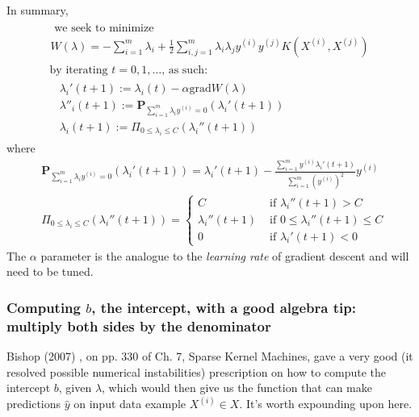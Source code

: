 \documentclass[10pt]{amsart}
\begin{document}
\begin{multicols*}{2}
In summary,
\begin{equation}\label{Eq:DualFormulationW}
\boxed{ \begin{gathered}
  \begin{gathered}
    \text{ we seek to minimize } \\
    W(\lambda) = - \sum_{i=1}^m \lambda_i + \frac{1}{2} \sum_{i,j=1}^m \lambda_i \lambda_j y^{(i)} y^{(j)} K(X^{(i)},X^{(j)}) 
  \end{gathered} \\
  \text{  by iterating $t=0,1,\dots $, as such: } \\
  \begin{aligned}
    & \lambda_i'(t+1):=\lambda_i(t) - \alpha \text{grad}{ W(\lambda) } \\ 
    & \lambda''_i(t+1):= \mathbf{P}_{\sum_{i=1}^m \lambda_i y^{(i)} = 0 }( \lambda_i'(t+1)) \\ 
    & \lambda_i(t+1) := \Pi_{0\leq \lambda_i \leq C}(\lambda_i''(t+1))
    \end{aligned}
\end{gathered} }
\end{equation}
where
\begin{equation}\label{Eq:ProjectionOpsAlgo}
\boxed{ \begin{aligned}
& \mathbf{P}_{\sum_{i=1}^m \lambda_i y^{(i)} = 0 }( \lambda_i'(t+1)) = \lambda_i'(t+1) - \frac{ \sum_{i=1}^m y^{(i)}\lambda_i'(t+1) }{ \sum_{i=1}^m (y^{(i)})^2 } y^{(i)} \\ 
  & \Pi_{0\leq \lambda_i \leq C}(\lambda_i''(t+1)) = \begin{cases} C & \text{ if } \lambda_i''(t+1) > C \\
    \lambda_i''(t+1) & \text{ if } 0 \leq \lambda_i''(t+1) \leq C \\
    0 & \text{ if } \lambda_i'(t+1) <0 \end{cases}
\end{aligned} }
\end{equation}
The $\alpha$ parameter is the analogue to the \emph{learning rate} of gradient descent and will need to be tuned.  

\subsubsection{Computing $b$, the intercept, with a good algebra tip: multiply both sides by the denominator}\label{SubSec:binterceptcompute}

Bishop (2007) \cite{Bish2007}, on pp. 330 of Ch. 7, Sparse Kernel Machines,  gave a very good (it resolved possible numerical instabilities) prescription on how to compute the intercept $b$, given $\lambda$, which would then give us the function that can make predictions $\widehat{y}$ on input data example $X^{(i)} \in X$.  It's worth expounding upon here.  


\end{multicols*}
\end{document}

